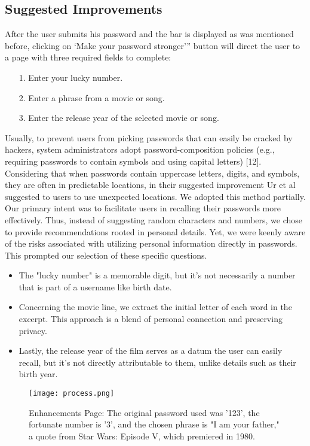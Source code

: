 \documentclass[5p,twocolumn]{elsarticle}
\begin{document}
\subsection{\textbf{Suggested Improvements}}
After the user submits his password and the bar is displayed as was mentioned before, clicking on ‘Make your password stronger’” button will direct the user to a page with three required fields to complete:
\begin{enumerate}
\item[1.] 
Enter your lucky number.
\item[2.]
Enter a phrase from a movie or song.
\item[3.]
Enter the release year of the selected movie or song.
\end{enumerate}
Usually, to prevent users from picking passwords that can easily be cracked by hackers, system administrators adopt password-composition policies (e.g., requiring passwords to contain symbols and using capital letters) [12]. Considering that when passwords contain uppercase letters, digits, and symbols, they are often in predictable locations, in their suggested improvement Ur et al suggested to users to use unexpected locations. We adopted this method partially. Our primary intent was to facilitate users in recalling their passwords more effectively. Thus, instead of suggesting random characters and numbers, we chose to provide recommendations rooted in personal details. Yet, we were keenly aware of the risks associated with utilizing personal information directly in passwords. This prompted our selection of these specific questions.
 \begin{itemize}
     \item The "lucky number" is a memorable digit, but it's not necessarily a number that is part of a username like birth date.
 \end{itemize}
\begin{itemize}
    \item Concerning the movie line, we extract the initial letter of each word in the excerpt. This approach is a blend of personal connection and preserving privacy.
\end{itemize}
 \begin{itemize}
     \item Lastly, the release year of the film serves as a datum the user can easily recall, but it's not directly attributable to them, unlike details such as their birth year.
 \end{itemize}
     \begin{figure}[h]
\centering 
\texttt{[image: process.png]}
\caption{Enhancements Page: The original password used was '123', the fortunate number is '3', and the chosen phrase is "I am your father," a quote from Star Wars: Episode V, which premiered in 1980.}
\label{fig_mom0}%
\end{figure}
\end{document}
